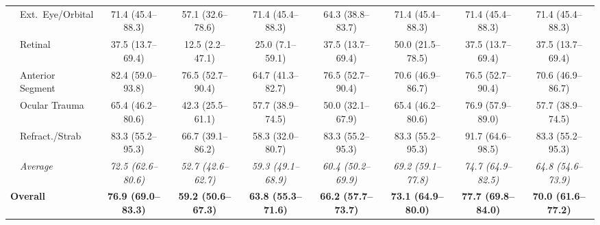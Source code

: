\documentclass[10pt,journal,compsoc, onecolumn]{IEEEtran}
\begin{document}
\begin{table}[!htbp]
{\begin{tabular}{ll c @{\hskip 6pt} ccc @{\hskip 6pt} ccc}
& Ext.\ Eye/Orbital  & 71.4 (45.4--88.3) & 57.1 (32.6--78.6) & 71.4 (45.4--88.3) & 64.3 (38.8--83.7) & 71.4 (45.4--88.3) & 71.4 (45.4--88.3) & 71.4 (45.4--88.3) \\
& Retinal            & 37.5 (13.7--69.4) & 12.5 (2.2--47.1) & 25.0 (7.1--59.1) & 37.5 (13.7--69.4) & 50.0 (21.5--78.5) & 37.5 (13.7--69.4) & 37.5 (13.7--69.4) \\
& Anterior Segment   & 82.4 (59.0--93.8) & 76.5 (52.7--90.4) & 64.7 (41.3--82.7) & 76.5 (52.7--90.4) & 70.6 (46.9--86.7) & 76.5 (52.7--90.4) & 70.6 (46.9--86.7) \\
& Ocular Trauma      & 65.4 (46.2--80.6) & 42.3 (25.5--61.1) & 57.7 (38.9--74.5) & 50.0 (32.1--67.9) & 65.4 (46.2--80.6) & 76.9 (57.9--89.0) & 57.7 (38.9--74.5) \\
& Refract./Strab & 83.3 (55.2--95.3) & 66.7 (39.1--86.2) & 58.3 (32.0--80.7) & 83.3 (55.2--95.3) & 83.3 (55.2--95.3) & 91.7 (64.6--98.5) & 83.3 (55.2--95.3) \\
\cmidrule{2-9}
& \textit{Average}   & \textit{72.5 (62.6--80.6)} & \textit{52.7 (42.6--62.7)} & \textit{59.3 (49.1--68.9)} & \textit{60.4 (50.2--69.9)} & \textit{69.2 (59.1--77.8)} & \textit{74.7 (64.9--82.5)} & \textit{64.8 (54.6--73.9)} \\
\midrule
\multicolumn{2}{l}{\textbf{Overall}} & \textbf{76.9 (69.0--83.3)} & \textbf{59.2 (50.6--67.3)} & \textbf{63.8 (55.3--71.6)} & \textbf{66.2 (57.7--73.7)} & \textbf{73.1 (64.9--80.0)} & \textbf{77.7 (69.8--84.0)} & \textbf{70.0 (61.6--77.2)} \\
\bottomrule
\end{tabular}%
}
\end{table}
\end{document}
